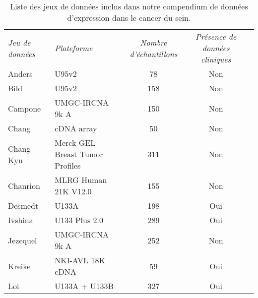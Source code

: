       \begin{table}
        \begin{center}
          \caption{Liste des jeux de données inclus dans notre compendium de données d'expression dans le cancer du sein.}
          \begin{tabular}{llccc}
            \toprule
            \multirow{3}{3cm}{\emph{Jeu de données}} & \multirow{3}{2cm}{\emph{Plateforme}} & \multirow{3}{2cm}{\centering\emph{Nombre d'échantillons}} & \multirow{3}{2cm}{\centering\emph{Présence de données cliniques}} \\
                                  &                                 &                        & \\
                                  &                                 &                        & \\
            \midrule
            Anders                & U95v2                           & 78                     & Non                   \\
            Bild                  & U95v2                           & 158                    & Non                   \\
            Campone               & UMGC-IRCNA 9k A                 & 150                    & Non                   \\
            Chang                 & cDNA array                      & 50                     & Non                   \\
            Chang-Kyu             & Merck GEL Breast Tumor Profiles & 311                    & Non                   \\
            Chanrion              & MLRG Human 21K V12.0            & 155                    & Non                   \\
            Desmedt               & U133A                           & 198                    & Oui                   \\
            Ivshina               & U133 Plus 2.0                   & 289                    & Oui                   \\
            Jezequel              & UMGC-IRCNA 9k A                 & 252                    & Non                   \\
            Kreike                & NKI-AVL 18K cDNA                & 59                     & Oui                   \\
            Loi                   & U133A + U133B                   & 327                    & Oui                   \\

\end{tabular}
\end{center}
\end{table}
